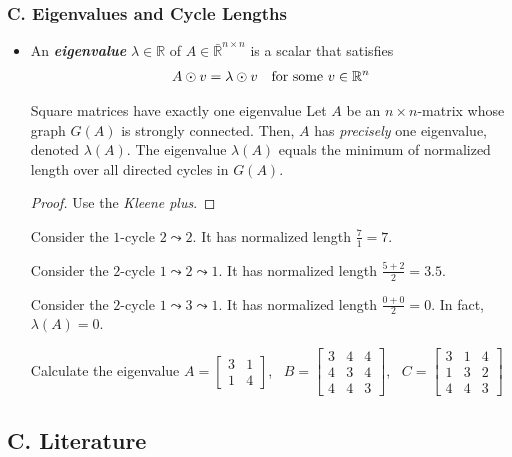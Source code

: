 \documentclass{article}
\begin{document}
\subsubsection*{C. Eigenvalues and Cycle Lengths}
\begin{itemize}
	\item An \textbf{\textit{eigenvalue}} \( \lambda \in \mathbb{R}  \) of \( A \in \bar{\mathbb{R}}^{n \times n} \) is a scalar that satisfies 
	\begin{align*}
		A \odot v = \lambda \odot v\quad \text{for some \( v \in \mathbb{R}^n \)}
	\end{align*}
 
	\begin{theorem*}{Square matrices have exactly one eigenvalue  \cite[Thm. 7.11]{inv2nonlinearalgebra}}{}
		Let \( A \) be an \( n \times n \)-matrix whose graph \( G(A) \) is strongly connected. Then, \( A \) has \emph{precisely} one eigenvalue, denoted \( \lambda(A) \). The eigenvalue \( \lambda(A) \) equals the minimum of normalized length over all directed cycles in \( G(A) \).
	\end{theorem*}

	\begin{proof}
		Use the {\textit{Kleene plus}}.
	\end{proof}

	\begin{example*}{}{}
		

		Consider the \( 1 \)-cycle \( 2 \leadsto 2 \). It has normalized length \( \frac{7}{1} = 7 \).

		Consider the \( 2 \)-cycle \( 1 \leadsto 2 \leadsto 1 \). It has normalized length \( \frac{5 + 2}{2} = 3.5 \).

		Consider the \( 2 \)-cycle \( 1 \leadsto 3 \leadsto 1 \). It has normalized length \( \frac{0 + 0}{2} = 0 \). In fact, \( \lambda(A) = 0 \).
	\end{example*}

	\begin{exercise*}{Calculate the eigenvalue}{}
		\( A = \begin{bmatrix}
			3 & 1 \\
			1 & 4
		\end{bmatrix} \), \, \(  B = \begin{bmatrix}
			3 & 4 & 4 \\
			4 & 3 & 4 \\
			4 & 4 & 3
		\end{bmatrix} \), \, \( C =  \begin{bmatrix}
			3 & 1 & 4 \\
			1 & 3 & 2 \\
			4 & 4 & 3
		\end{bmatrix}\)
	\end{exercise*}
\end{itemize}

\subsection*{C. Literature}


\end{document}
